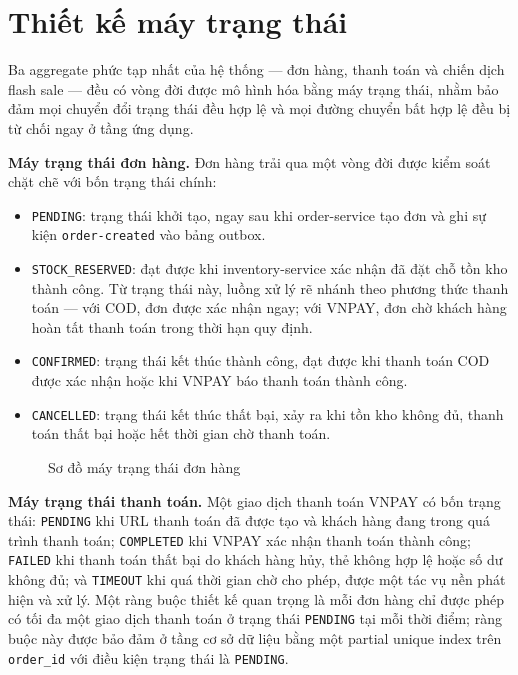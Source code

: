 \documentclass[../DoAn.tex]{subfiles}
\begin{document}
{\section{Thiết kế máy trạng thái}
\label{section:4.9}

Ba aggregate phức tạp nhất của hệ thống --- đơn hàng, thanh toán và chiến dịch flash sale ---
đều có vòng đời được mô hình hóa bằng máy trạng thái, nhằm bảo đảm mọi chuyển đổi trạng thái
đều hợp lệ và mọi đường chuyển bất hợp lệ đều bị từ chối ngay ở tầng ứng dụng.

\textbf{Máy trạng thái đơn hàng.} Đơn hàng trải qua một vòng đời được kiểm soát chặt chẽ với
bốn trạng thái chính:

\begin{itemize}[noitemsep]
    \item \texttt{PENDING}: trạng thái khởi tạo, ngay sau khi order-service tạo đơn và ghi
          sự kiện \texttt{order-created} vào bảng outbox.
    \item \texttt{STOCK\_RESERVED}: đạt được khi inventory-service xác nhận đã đặt chỗ tồn
          kho thành công. Từ trạng thái này, luồng xử lý rẽ nhánh theo phương thức thanh
          toán --- với COD, đơn được xác nhận ngay; với VNPAY, đơn chờ khách hàng hoàn tất
          thanh toán trong thời hạn quy định.
    \item \texttt{CONFIRMED}: trạng thái kết thúc thành công, đạt được khi thanh toán COD
          được xác nhận hoặc khi VNPAY báo thanh toán thành công.
    \item \texttt{CANCELLED}: trạng thái kết thúc thất bại, xảy ra khi tồn kho không đủ,
          thanh toán thất bại hoặc hết thời gian chờ thanh toán.
\end{itemize}

\begin{figure}[!H]
    \centering
    \caption{Sơ đồ máy trạng thái đơn hàng}
    \label{fig:order-state-machine}
\end{figure}

\textbf{Máy trạng thái thanh toán.} Một giao dịch thanh toán VNPAY có bốn trạng thái:
\texttt{PENDING} khi URL thanh toán đã được tạo và khách hàng đang trong quá trình thanh
toán; \texttt{COMPLETED} khi VNPAY xác nhận thanh toán thành công; \texttt{FAILED} khi thanh
toán thất bại do khách hàng hủy, thẻ không hợp lệ hoặc số dư không đủ; và \texttt{TIMEOUT}
khi quá thời gian chờ cho phép, được một tác vụ nền phát hiện và xử lý. Một ràng buộc thiết
kế quan trọng là mỗi đơn hàng chỉ được phép có tối đa một giao dịch thanh toán ở trạng thái
\texttt{PENDING} tại mỗi thời điểm; ràng buộc này được bảo đảm ở tầng cơ sở dữ liệu bằng một
partial unique index trên \texttt{order\_id} với điều kiện trạng thái là \texttt{PENDING}.

}
\end{document}
